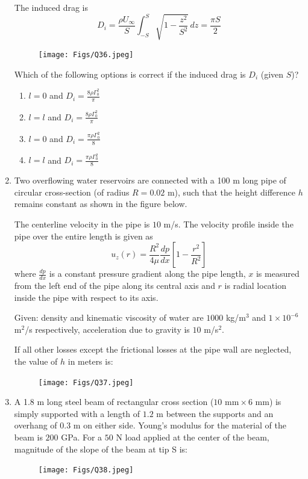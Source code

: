 \documentclass[journal]{IEEEtran}
\begin{document}
\begin{enumerate}
The induced drag is  
$$
D_i = \frac{\rho U_\infty}{S} \int_{-S}^S \sqrt{1 - \frac{z^2}{S^2}} \, dz = \frac{\pi S}{2}
$$ 

\begin{figure}[H]
\centering
\texttt{[image: Figs/Q36.jpeg]}
\caption{}
\end{figure}

Which of the following options is correct if the induced drag is $D_i$ (given $S$)?

\begin{multicols}{2}
\begin{enumerate}
    \item $l = 0$ and $D_i = \frac{8 \rho \Gamma_0^2}{\pi}$
    \item $l = l$ and $D_i = \frac{8 \rho \Gamma_0^2}{\pi}$
    \item $l = 0$ and $D_i = \frac{\pi \rho \Gamma_0^2}{8}$
    \item $l = l$ and $D_i = \frac{\pi \rho \Gamma_0^2}{8}$
\end{enumerate}
\end{multicols}

\hfill{}

\item \quad Two overflowing water reservoirs are connected with a 100 m long pipe of circular cross-section (of radius $R = 0.02$ m), such that the height difference $h$ remains constant as shown in the figure below.  

The centerline velocity in the pipe is $10$ m/s. The velocity profile inside the pipe over the entire length is given as  
$$
u_z(r) = \frac{R^2}{4\mu} \frac{dp}{dx} \left[ 1 - \frac{r^2}{R^2} \right]
$$ 
where $\frac{dp}{dx}$ is a constant pressure gradient along the pipe length, $x$ is measured from the left end of the pipe along its central axis and $r$ is radial location inside the pipe with respect to its axis.  

Given: density and kinematic viscosity of water are $1000$ kg/m$^3$ and $1\times 10^{-6}$ m$^2$/s respectively, acceleration due to gravity is $10$ m/s$^2$.  

If all other losses except the frictional losses at the pipe wall are neglected, the value of $h$ in meters is:
\begin{figure}[H]
\centering
\texttt{[image: Figs/Q37.jpeg]}
\caption{}
\end{figure}
\hfill{}

\item \quad A 1.8 m long steel beam of rectangular cross section ($10 \text{ mm} \times 6 \text{ mm}$) is simply supported with a length of $1.2$ m between the supports and an overhang of $0.3$ m on either side. Young's modulus for the material of the beam is $200$ GPa. For a $50$ N load applied at the center of the beam, magnitude of the slope of the beam at tip S is:
\begin{figure}[H]
\centering
\texttt{[image: Figs/Q38.jpeg]}
\caption{}
\end{figure}
\hfill{}


\end{enumerate}
\end{document}
